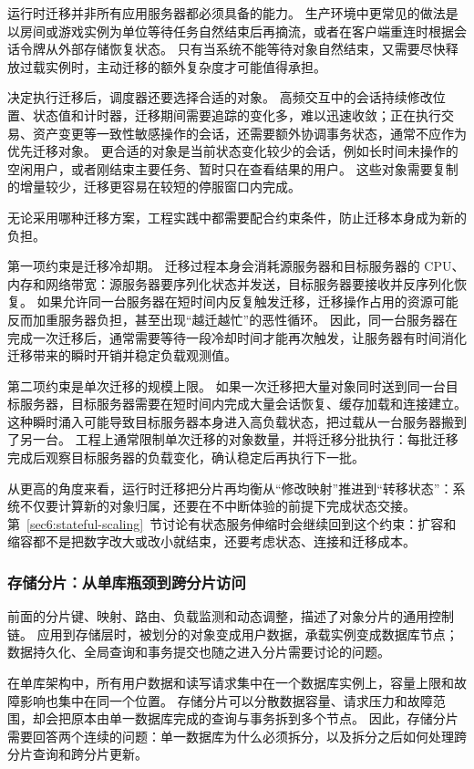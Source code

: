 运行时迁移并非所有应用服务器都必须具备的能力。
生产环境中更常见的做法是以房间或游戏实例为单位等待任务自然结束后再摘流，或者在客户端重连时根据会话令牌从外部存储恢复状态。
只有当系统不能等待对象自然结束，又需要尽快释放过载实例时，主动迁移的额外复杂度才可能值得承担。

决定执行迁移后，调度器还要选择合适的对象。
高频交互中的会话持续修改位置、状态值和计时器，迁移期间需要追踪的变化多，难以迅速收敛；正在执行交易、资产变更等一致性敏感操作的会话，还需要额外协调事务状态，通常不应作为优先迁移对象。
更合适的对象是当前状态变化较少的会话，例如长时间未操作的空闲用户，或者刚结束主要任务、暂时只在查看结果的用户。
这些对象需要复制的增量较少，迁移更容易在较短的停服窗口内完成。

无论采用哪种迁移方案，工程实践中都需要配合约束条件，防止迁移本身成为新的负担。

第一项约束是迁移冷却期。
迁移过程本身会消耗源服务器和目标服务器的 CPU、内存和网络带宽：源服务器要序列化状态并发送，目标服务器要接收并反序列化恢复。
如果允许同一台服务器在短时间内反复触发迁移，迁移操作占用的资源可能反而加重服务器负担，甚至出现“越迁越忙”的恶性循环。
因此，同一台服务器在完成一次迁移后，通常需要等待一段冷却时间才能再次触发，让服务器有时间消化迁移带来的瞬时开销并稳定负载观测值。

第二项约束是单次迁移的规模上限。
如果一次迁移把大量对象同时送到同一台目标服务器，目标服务器需要在短时间内完成大量会话恢复、缓存加载和连接建立。
这种瞬时涌入可能导致目标服务器本身进入高负载状态，把过载从一台服务器搬到了另一台。
工程上通常限制单次迁移的对象数量，并将迁移分批执行：每批迁移完成后观察目标服务器的负载变化，确认稳定后再执行下一批。

从更高的角度来看，运行时迁移把分片再均衡从“修改映射”推进到“转移状态”：系统不仅要计算新的对象归属，还要在不中断体验的前提下完成状态交接。
第~\ref{sec6:stateful-scaling}~节讨论有状态服务伸缩时会继续回到这个约束：扩容和缩容都不是把数字改大或改小就结束，还要考虑状态、连接和迁移成本。


\subsubsection{存储分片：从单库瓶颈到跨分片访问}\label{sec4:storage-sharding-deep-dive}

前面的分片键、映射、路由、负载监测和动态调整，描述了对象分片的通用控制链。
应用到存储层时，被划分的对象变成用户数据，承载实例变成数据库节点；数据持久化、全局查询和事务提交也随之进入分片需要讨论的问题。

在单库架构中，所有用户数据和读写请求集中在一个数据库实例上，容量上限和故障影响也集中在同一个位置。
存储分片可以分散数据容量、请求压力和故障范围，却会把原本由单一数据库完成的查询与事务拆到多个节点。
因此，存储分片需要回答两个连续的问题：单一数据库为什么必须拆分，以及拆分之后如何处理跨分片查询和跨分片更新。

